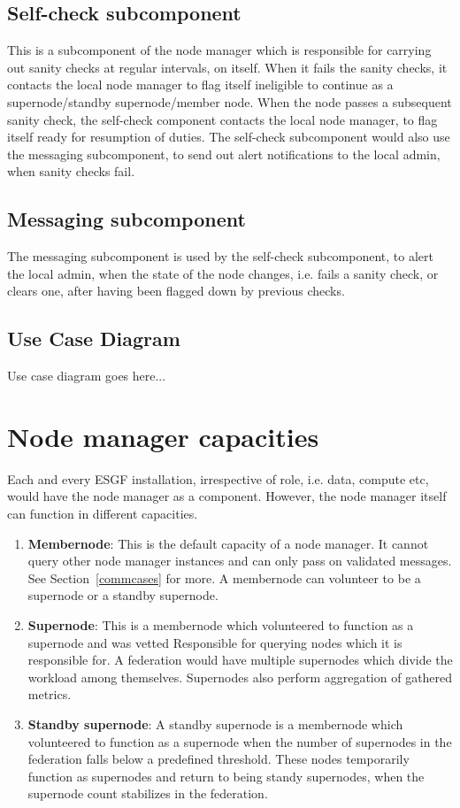 \documentclass[oneside,12pt]{memoir}
\begin{document}
\subsection{Self-check subcomponent}
This is a subcomponent of the node manager which is responsible for carrying out sanity checks at regular intervals, on itself. When it fails the sanity checks, it contacts the local node manager to flag itself ineligible to continue as a supernode/standby supernode/member node. When the node passes a subsequent sanity check, the self-check component contacts the local node manager, to flag itself ready for resumption of duties.  The self-check subcomponent would also use the messaging subcomponent, to send out alert notifications to the local admin, when sanity checks fail.

\subsection{Messaging subcomponent}
The messaging subcomponent is used by the self-check subcomponent, to alert the local admin, when the state of the node changes, i.e. fails a sanity check, or clears one, after having been flagged down by previous checks.

\subsection{Use Case Diagram}
Use case diagram goes here...

\section{Node manager capacities}
Each and every ESGF installation, irrespective of role, i.e. data, compute etc, would have the node manager as a component.  However, the node manager itself can function in different capacities. 
\begin{enumerate}
\item \textbf{Membernode}: This is the default capacity of a node manager. It cannot query other node manager instances and can only pass on validated messages. See Section~\ref{commcases} for more. A membernode can volunteer to be a supernode or a standby supernode.
\item \textbf{Supernode}: This is a membernode which volunteered to function as a supernode and was vetted Responsible for querying nodes which it is responsible for.  A federation would have multiple supernodes which divide the workload among themselves. Supernodes also perform aggregation of gathered metrics. 
\item \textbf{Standby supernode}: A standby supernode is a membernode which volunteered to function as a supernode when the number of supernodes in the federation falls below a predefined threshold. These nodes temporarily function as supernodes and return to being standy supernodes, when the supernode count stabilizes in the federation.
\end{enumerate}
\end{document}
